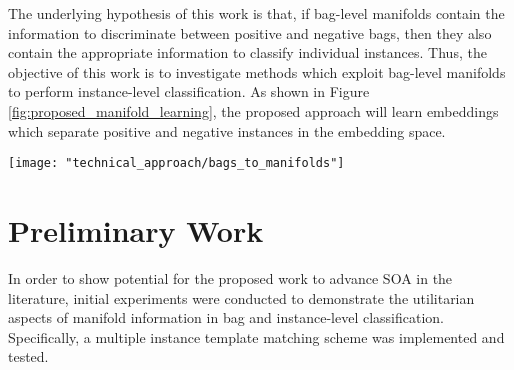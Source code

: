 \noindent The underlying hypothesis of this work is that, if bag-level manifolds contain the information to discriminate between positive and negative bags, then they also contain the appropriate information to classify individual instances. Thus, the objective of this work is to investigate methods which exploit bag-level manifolds to perform instance-level classification.  As shown in Figure \ref{fig:proposed_manifold_learning}, the proposed approach will learn embeddings which separate positive and negative instances in the embedding space.

\begin{center}
	\begin{figure*}[h]
		\centering
		\texttt{[image: "technical\_approach/bags\_to\_manifolds"]}
		\caption[Mapping of instances to separable manifolds]{Proposed conceptual approach.  Using only bag-level information, the goal is to map individual instances to manifolds which are well-separated in the embedding feature space.}
		\label{fig:proposed_manifold_learning}
	\end{figure*}
\end{center}

\section{Preliminary Work} \label{sec:tech_approach_prelim_work}
In order to show potential for the proposed work to advance SOA in the literature, initial experiments were conducted to demonstrate the utilitarian aspects of manifold information in bag and instance-level classification.  Specifically, a multiple instance template matching scheme was implemented and tested. 

